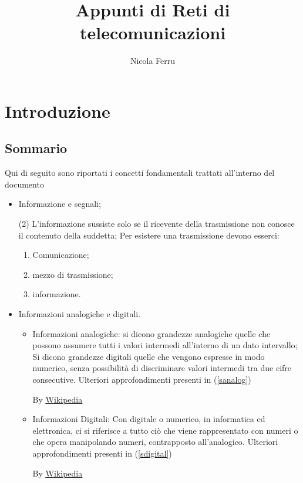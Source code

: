 \documentclass{book}
\title{Appunti di Reti di telecomunicazioni}
\author{Nicola Ferru}
\date{}
\begin{document}
\maketitle
\tableofcontents
\listoftables
\listoffigures
\chapter{Introduzione}
\section{Sommario}
Qui di seguito sono riportati i concetti fondamentali trattati all'interno
del documento
\begin{itemize}
	\item Informazione e segnali;
		\begin{tasks}(2)
			\task L'informazione sussiste solo se il ricevente della
			trasmissione non conosce il contenuto della suddetta;
			\task Per esistere una trasmissione devono esserci:
				\begin{enumerate}
					\item Comunicazione;
					\item mezzo di trasmissione;
					\item informazione.
				\end{enumerate}
		\end{tasks}
	\item Informazioni analogiche e digitali.
		\begin{itemize}
			\item Informazioni analogiche: si dicono grandezze analogiche
				quelle che possono assumere tutti i valori intermedi
				all'interno di un dato intervallo; Si dicono grandezze digitali
				quelle che vengono espresse in modo numerico, senza possibilità
				di discriminare valori intermedi tra due cifre consecutive.
				Ulteriori approfondimenti presenti in (\ref{sanalog})
				\begin{center}
					By
					\underline{\href{https://it.wikipedia.org/wiki/Analogico}{Wikipedia}}
				\end{center}
			\item Informazioni Digitali: Con digitale o numerico, in
				informatica ed elettronica, ci si riferisce a tutto ciò che
				viene rappresentato con numeri o che opera manipolando numeri,
				contrapposto all'analogico. Ulteriori approfondimenti presenti
				in (\ref{sdigital})
				\begin{center}
					By \underline{\href{https://it.wikipedia.org/wiki/Digitale_(informatica)}{Wikipedia}}
				\end{center}
		\end{itemize}
\end{itemize}
\end{document}
